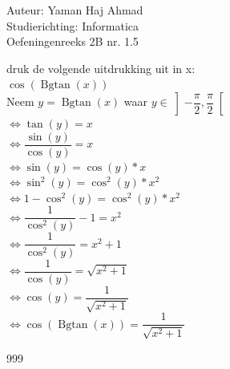\documentclass[a4paper]{article}
\begin{document}
\noindent \large Auteur: Yaman Haj Ahmad \\
\noindent \large Studierichting: Informatica\\
\noindent \large Oefeningenreeks 2B nr. 1.5\\

\medskip

\normalsize

druk de volgende uitdrukking uit in x:\\

$\cos (\operatorname{Bgtan} \left(x\right))$\\

Neem $y = \operatorname{Bgtan} \left(x\right)$ waar $y \in \left]-\dfrac{\pi}{2},\dfrac{\pi}{2}\right[$\\

$\Leftrightarrow \tan \left(y\right) = x$\\

$\Leftrightarrow \dfrac{\sin \left(y\right)}{\cos \left(y\right)} = x$\\

$\Leftrightarrow \sin \left(y\right) = \cos\left(y\right) * x$\\

$\Leftrightarrow  \sin^2\left(y\right) = \cos^2\left(y\right) * x^2 $\\

$\Leftrightarrow 1 - \cos^2 \left(y\right) = \cos^2 \left(y\right) * x^2$\\

$\Leftrightarrow \dfrac{1}{\cos^2\left(y\right)} - 1 = x^2$\\

$\Leftrightarrow \dfrac{1}{\cos^2\left(y\right)} = x^2 + 1$\\

$\Leftrightarrow \dfrac{1}{\cos\left(y\right)} = \sqrt{x^2 + 1}$\\

$\Leftrightarrow \cos\left(y\right) = \dfrac{1}{\sqrt{x^2 + 1}}$\\

$\Leftrightarrow \cos\left(\operatorname{Bgtan}\left(x\right)\right) = \dfrac{1}{\sqrt{x^2 + 1}}$

\begin{thebibliography}{999}
\end{thebibliography}
\end{document}
